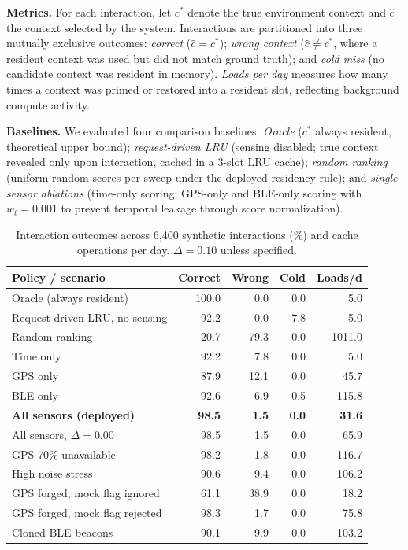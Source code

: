 \documentclass[conference]{IEEEtran}
\begin{document}
\textbf{Metrics.}
For each interaction, let $c^\ast$ denote the true environment context and $\hat{c}$ the context selected by the system. Interactions are partitioned into three mutually exclusive outcomes: \emph{correct} ($\hat{c} = c^\ast$); \emph{wrong context} ($\hat{c} \neq c^\ast$, where a resident context was used but did not match ground truth); and \emph{cold miss} (no candidate context was resident in memory). \emph{Loads per day} measures how many times a context was primed or restored into a resident slot, reflecting background compute activity.

\textbf{Baselines.}
We evaluated four comparison baselines: \emph{Oracle} ($c^\ast$ always resident, theoretical upper bound); \emph{request-driven LRU} (sensing disabled; true context revealed only upon interaction, cached in a 3-slot LRU cache); \emph{random ranking} (uniform random scores per sweep under the deployed residency rule); and \emph{single-sensor ablations} (time-only scoring; GPS-only and BLE-only scoring with $w_t = 0.001$ to prevent temporal leakage through score normalization).

\begin{table}[t]
\centering
\caption{Interaction outcomes across 6,400 synthetic interactions (\%) and cache operations per day. $\Delta = 0.10$ unless specified.}
\label{tab:prediction}
\footnotesize
\setlength{\tabcolsep}{3pt}
\begin{tabular}{@{}lrrrr@{}}
\toprule
Policy / scenario & Correct & Wrong & Cold & Loads/d \\
\midrule
Oracle (always resident) & 100.0 & 0.0 & 0.0 & 5.0 \\
Request-driven LRU, no sensing & 92.2 & 0.0 & 7.8 & 5.0 \\
Random ranking & 20.7 & 79.3 & 0.0 & 1011.0 \\
Time only & 92.2 & 7.8 & 0.0 & 5.0 \\
GPS only & 87.9 & 12.1 & 0.0 & 45.7 \\
BLE only & 92.6 & 6.9 & 0.5 & 115.8 \\
\textbf{All sensors (deployed)} & \textbf{98.5} & \textbf{1.5} & \textbf{0.0} & \textbf{31.6} \\
All sensors, $\Delta = 0.00$ & 98.5 & 1.5 & 0.0 & 65.9 \\
GPS 70\% unavailable & 98.2 & 1.8 & 0.0 & 116.7 \\
High noise stress & 90.6 & 9.4 & 0.0 & 106.2 \\
\midrule
GPS forged, mock flag ignored & 61.1 & 38.9 & 0.0 & 18.2 \\
GPS forged, mock flag rejected & 98.3 & 1.7 & 0.0 & 75.8 \\
Cloned BLE beacons & 90.1 & 9.9 & 0.0 & 103.2 \\
\bottomrule
\end{tabular}
\end{table}
\end{document}
